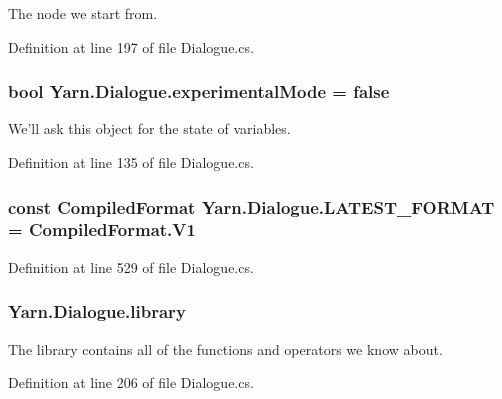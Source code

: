 The node we start from. 



Definition at line 197 of file Dialogue.\-cs.

\hypertarget{a00092_a2a5ac23441861eef13c59044cc218f09}{
\subsubsection[{experimental\-Mode}]{\setlength{\rightskip}{0pt plus 5cm}bool Yarn.\-Dialogue.\-experimental\-Mode = false}}\label{a00092_a2a5ac23441861eef13c59044cc218f09}


We'll ask this object for the state of variables. 



Definition at line 135 of file Dialogue.\-cs.

\hypertarget{a00092_a3bc83587462ade6a2f7f42cb7576e50e}{
\subsubsection[{L\-A\-T\-E\-S\-T\-\_\-\-F\-O\-R\-M\-A\-T}]{\setlength{\rightskip}{0pt plus 5cm}const {\bf Compiled\-Format} Yarn.\-Dialogue.\-L\-A\-T\-E\-S\-T\-\_\-\-F\-O\-R\-M\-A\-T = Compiled\-Format.\-V1}}\label{a00092_a3bc83587462ade6a2f7f42cb7576e50e}


Definition at line 529 of file Dialogue.\-cs.

\hypertarget{a00092_ae660d4cfb6e296358d2f61d8ee74c66a}{
\subsubsection[{library}]{ Yarn.\-Dialogue.\-library}}\label{a00092_ae660d4cfb6e296358d2f61d8ee74c66a}


The library contains all of the functions and operators we know about. 



Definition at line 206 of file Dialogue.\-cs.



